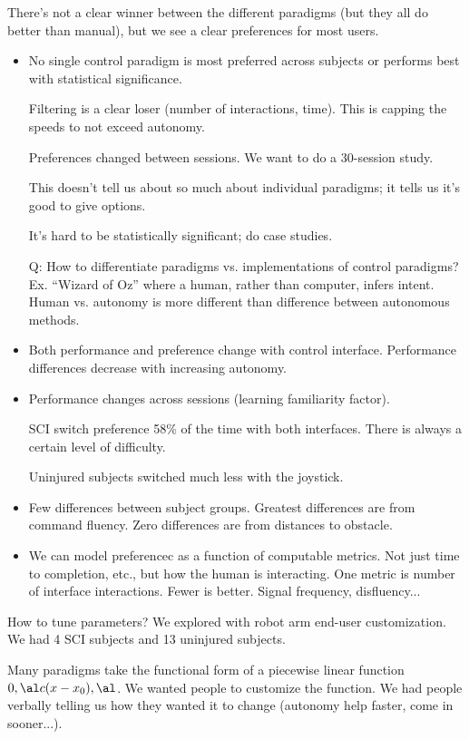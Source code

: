 There's not a clear winner between the different paradigms (but they all do better than manual), but we see a clear preferences for most users. 
\begin{itemize}
\item
No single control paradigm is most preferred across subjects or performs best with statistical significance.

Filtering is a clear loser (number of interactions, time). This is capping the speeds to not exceed autonomy. 

Preferences changed between sessions. We want to do a 30-session study. 

This doesn't tell us about so much about individual paradigms; it tells us it's good to give options.

It's hard to be statistically significant; do case studies.

Q: How to differentiate paradigms vs. implementations of control paradigms? %
Ex. ``Wizard of Oz'' where a human, rather than computer, infers intent.
Human vs. autonomy is more different than difference between autonomous methods.
\item
Both performance and preference change with control interface. Performance differences decrease with increasing autonomy.
\item
Performance changes across sessions (learning familiarity factor).

SCI switch preference 58\% of the time with both interfaces. There is always a certain level of difficulty.

Uninjured subjects switched much less with the joystick.
\item
Few differences between subject groups. Greatest differences are from command fluency. Zero differences are from distances to obstacle.
\item
We can model preferencec as a function of computable metrics. Not just time to completion, etc., but how the human is interacting. One metric is number of interface interactions. Fewer is better. Signal frequency, disfluency...
\end{itemize}

How to tune parameters? We explored with robot arm end-user customization. We had 4 SCI subjects and 13 uninjured subjects. 

Many paradigms take the functional form of a piecewise linear function $0, \al c (x-x_0), \al$. We wanted people to customize the function. We had people verbally telling us how they wanted it to change (autonomy help faster, come in sooner...). 

